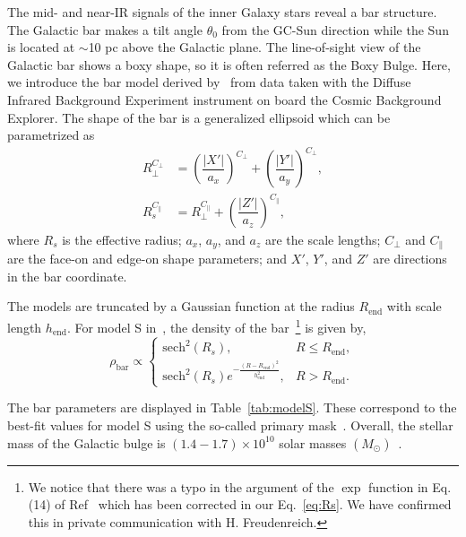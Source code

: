 \documentclass[doublespace,nopageskip]{VTthesis} %
\begin{document}
The mid- and near-IR signals of the inner Galaxy stars reveal a bar structure. The Galactic bar makes a tilt angle $\theta_0$ from the GC-Sun direction while the Sun is located at $\sim$10 pc above the Galactic plane. The line-of-sight view of the Galactic bar shows a boxy shape, so it is often referred as the Boxy Bulge. Here, we introduce the bar model derived by~\citet{1998ApJ...492..495F} from data taken with the Diffuse Infrared Background Experiment instrument on board the Cosmic Background Explorer. The shape of the bar is a generalized ellipsoid which can be parametrized as
\begin{align}\label{eq:Rs}
  R_{\perp}^{C_{\perp}} &= \left(\dfrac{|X'|}{a_x}\right)^{C_{\perp}} + \left(\dfrac{|Y'|}{a_y}\right)^{C_{\perp}},\\
  R_s^{C_{\parallel}} &= R_{\perp}^{C_{\parallel}} + \left(\dfrac{|Z'|}{a_z}\right)^{C_{\parallel}},
\end{align}
where $R_s$ is the effective radius; $a_x$, $a_y$, and $a_z$ are the scale lengths; $C_\perp$ and $C_\parallel$ are the face-on and edge-on shape parameters; and $X'$, $Y'$, and $Z'$
are directions in the bar
coordinate. 

The models are truncated by a Gaussian function at the
radius $R_{\text{end}}$ with scale length $h_{\text{end}}$. For model S in~\citet{1998ApJ...492..495F}, the density of the bar~\footnote{We notice that there was a typo in the argument of the $\exp$ function in Eq.(14) of Ref~\cite{1998ApJ...492..495F} which has been corrected in our Eq.~\ref{eq:Rs}. We have confirmed this in private communication with H. Freudenreich.} is given by,
\begin{equation}\label{eq:rhobar}
  \rho_{\text{bar}}\propto \begin{cases}
    \text{sech}^2(R_s), & R \leq R_{\text{end}},\\
    \text{sech}^2(R_s)e^{-\frac{(R-R_{\text{end}})^2}{h_{\text{end}}^2}}, &   R > R_{\text{end}}.
  \end{cases}
\end{equation}

The bar parameters 
are displayed in Table~\ref{tab:modelS}. These correspond to the best-fit values for model S using the so-called primary mask~\cite{1998ApJ...492..495F}. Overall, the stellar mass of the Galactic bulge is $(1.4-1.7)\times 10^{10}$ solar masses $(M_\odot)$~\cite{2016ARA&A..54..529B}.
\end{document}
